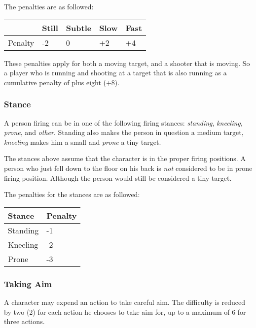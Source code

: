 The penalties are as followed:

\begin{center}
  \begin{tabular}{| l | l | l | l | l |}
    \hline
    \,      & Still & Subtle & Slow & Fast \\ \hline
    Penalty & -2    & 0      & +2   & +4   \\
    \hline
  \end{tabular}
\end{center}

These penalties apply for both a moving target, and a shooter that is moving. So
a player who is running and shooting at a target that is also running as a
cumulative penalty of plus eight (+8).

\subsubsection{Stance}

A person firing can be in one of the following firing stances: \emph{standing},
\emph{kneeling}, \emph{prone}, and \emph{other}. Standing also makes the person
in question a medium target, \emph{kneeling} makes him a small and \emph{prone}
a tiny target.

The stances above assume that the character is in the proper firing positions.
A person who just fell down to the floor on his back is \emph{not} considered to
be in prone firing position. Although the person would still be considered a
tiny target.

The penalties for the stances are as followed:

\begin{center}
  \begin{tabular}{| l | l |}
    \hline
    Stance   & Penalty \\ \hline
    Standing & -1      \\ \hline
    Kneeling & -2      \\ \hline
    Prone    & -3      \\
    \hline
  \end{tabular}
\end{center}

\subsubsection{Taking Aim}

A character may expend an action to take careful aim. The difficulty is reduced
by two (2) for each action he chooses to take aim for, up to a maximum of 6 for
three actions.

